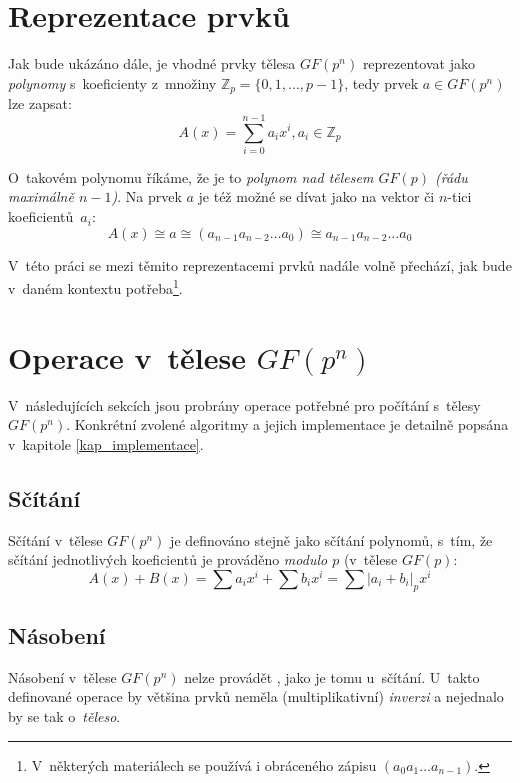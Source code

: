 \documentclass[thesis=M,czech,hidelinks]{FITthesis}[2012/06/26]
\newcommand{\0}{{\textcolor[gray]{0.80}{0}}}
\begin{document}
\section{Reprezentace prvků}
Jak bude ukázáno dále, je vhodné prvky tělesa $GF(p^n)$ reprezentovat jako
\emph{polynomy} s~koeficienty z~množiny $\mathbb{Z}_p=\{0,1,\ldots,p-1\}$, tedy
prvek $a \in GF(p^n)$ lze zapsat:
$$ A(x) = \sum_{i=0}^{n-1} a_i x^i, a_i \in \mathbb{Z}_p $$

O~takovém polynomu říkáme, že je to \emph{polynom nad tělesem $GF(p)$ (řádu
maximálně $n-1$)}. Na prvek $a$ je též možné se dívat jako na vektor či $n$-tici
koeficientů~$a_i$:
$$ A(x) \cong a \cong (a_{n-1} a_{n-2} \ldots a_0) \cong a_{n-1} a_{n-2}
\ldots a_0 $$

V~této práci se mezi těmito reprezentacemi prvků nadále volně přechází, jak
bude v~daném kontextu potřeba\footnote{
    V~některých materiálech se používá i obráceného zápisu
    $(a_0 a_1 \ldots a_{n-1})$.
}.

\section{Operace v~tělese $GF(p^n)$}
V~následujících sekcích jsou probrány operace potřebné pro počítání
s~tělesy $GF(p^n)$. Konkrétní zvolené algoritmy a jejich implementace
je detailně popsána v~kapitole \ref{kap_implementace}.

\subsection{Sčítání}
Sčítání v~tělese $GF(p^n)$ je definováno stejně jako sčítání polynomů, s~tím, že
sčítání jednotlivých koeficientů je prováděno \emph{modulo $p$} (v~tělese $GF(p)$:
$$ A(x) + B(x) = \sum a_i x^i + \sum b_i x^i = \sum \left|a_i + b_i\right|_p x^i $$


\subsection{Násobení}
Násobení v~tělese $GF(p^n)$ nelze provádět , jako je tomu
u~sčítání. U~takto definované operace by většina prvků neměla (multiplikativní)
\emph{inverzi} a nejednalo by se tak o~\emph{těleso}.
\end{document}
